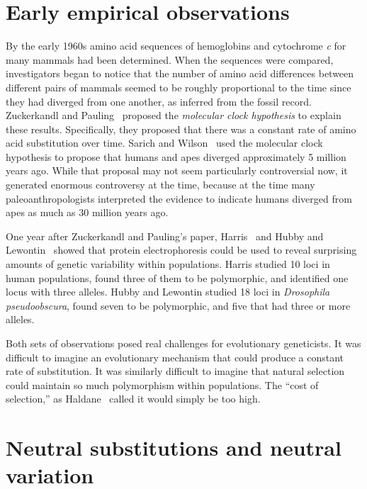 \section*{Early empirical observations}

By the early 1960s amino acid sequences of hemoglobins and cytochrome
{\it c\/} for many mammals had been determined. When the sequences
were compared, investigators began to notice that the number of amino
acid differences between different pairs of mammals seemed to be
roughly proportional to the time since they had diverged from one
another, as inferred from the fossil record. Zuckerkandl and
Pauling~\cite{Zuckerkandl-Pauling65} proposed the {\it molecular clock
hypothesis\/} to explain these results. Specifically, they proposed
that there was a constant rate of amino acid substitution over
time. Sarich and Wilson~\cite{Sarich-Wilson67,Wilson-Sarich69} used
the molecular clock hypothesis to propose that humans and apes
diverged approximately 5 million years ago. While that proposal may
not seem particularly controversial now, it generated enormous
controversy at the time, because at the time many paleoanthropologists
interpreted the evidence to indicate humans diverged from apes as much
as 30 million years ago.

One year after Zuckerkandl and Pauling's paper, Harris~\cite{Harris66}
and Hubby and Lewontin~\cite{Hubby-Lewontin66,Lewontin-Hubby66} showed
that protein electrophoresis could be used to reveal surprising
amounts of genetic variability within populations. Harris studied
10 loci in human populations, found three of them to be polymorphic,
and identified one locus with three alleles. Hubby and Lewontin
studied 18 loci in {\it Drosophila pseudoobscura\/}, found seven to be
polymorphic, and five that had three or more alleles.

Both sets of observations posed real challenges for evolutionary
geneticists. It was difficult to imagine an evolutionary mechanism
that could produce a constant rate of substitution. It was similarly
difficult to imagine that natural selection could maintain so much
polymorphism within populations. The ``cost of selection,'' as
Haldane~\cite{Haldane-1957} called it would simply be too
high.

\section*{Neutral substitutions and neutral variation}

